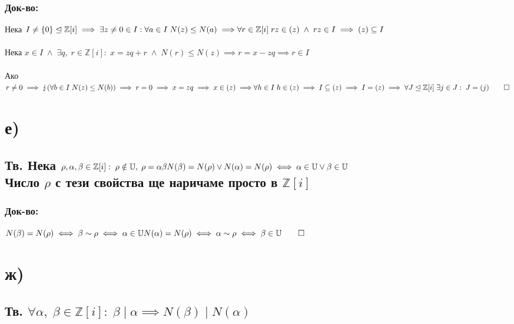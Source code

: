 \documentclass[12pt]{article}
\newcommand{\Z}{\mathbb{Z}}
\newcommand{\Rev}{\mathbb{U}}
\begin{document}
    \subsubsection*{Док-во:}
    Нека \(I \neq \{0\} \trianglelefteq \Z[i] \implies \exists z \neq 0 \in I : \forall a \in I \; N(z) \leq N(a) \implies \\\\
    \forall r \in \Z[i] \; rz \in (z) \; \wedge \; rz \in I \implies (z) \subseteq I\) \\\\
    Нека \(x \in I \; \wedge \; \exists q, \; r \in \Z[i] : \; x = zq + r \; \wedge \; N(r) \leq N(z) \implies r = x - zq \implies r \in I \) \\\\
    Ако \(r \neq 0 \implies \lightning (\forall b \in I \; N(z) \leq N(b)) \implies r = 0 \implies x = zq \implies x \in (z) \implies \\\\
    \forall h \in I \; h \in (z) \implies I \subseteq (z) \implies I = (z) \implies \forall J \trianglelefteq \Z[i] \; \exists j \in J : \; J = (j) \qed \)
    \section*{е)}
    \subsection*{Тв. Нека \(\rho, \alpha, \beta \in \Z[i] : \; \rho \notin \Rev, \; \rho = \alpha\beta \\
    N(\beta) = N(\rho) \vee N(\alpha) = N(\rho) \iff \alpha \in \Rev \vee \beta \in \Rev \) \\
    Число \(\rho\) с тези свойства ще наричаме просто в \(\Z[i]\)}
    \subsubsection*{Док-во:}
    \(N(\beta) = N(\rho) \iff \beta \sim \rho \iff \alpha \in \Rev \\\\
    N(\alpha) = N(\rho) \iff \alpha \sim \rho \iff \beta \in \Rev \qed \)
    \section*{ж)}
    \subsection*{Тв. \(\forall \alpha, \; \beta \in \Z[i] : \; \beta \; | \; \alpha \implies N(\beta) \; | \; N(\alpha) \)}
\end{document}
